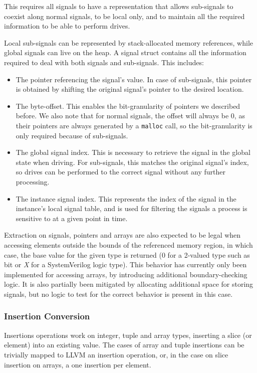 This requires all signals to have a representation that allows sub-signals to coexist along normal signals, to be local only, and to maintain all the required information to be able to perform drives.

Local sub-signals can be represented by stack-allocated memory references, while global signals can live on the heap. A signal struct contains all the information required to deal with both signals and sub-signals. This includes:

\begin{itemize}
    \item The pointer referencing the signal's value. In case of sub-signals, this pointer is obtained by shifting the original signal's pointer to the desired location.
    \item The byte-offset. This enables the bit-granularity of pointers we described before. We also note that for normal signals, the offset will always be $0$, as their pointers are always generated by a \texttt{malloc} call, so the bit-granularity is only required because of sub-signals.
    \item The global signal index. This is necessary to retrieve the signal in the global state when driving. For sub-signals, this matches the original signal's index, so drives can be performed to the correct signal without any further processing.
    \item The instance signal index. This represents the index of the signal in the instance's local signal table, and is used for filtering the signals a process is sensitive to at a given point in time.
\end{itemize}

Extraction on signals, pointers and arrays are also expected to be legal when accessing elements outside the bounds of the referenced memory region, in which case, the base value for the given type is returned (\ie $0$ for a 2-valued type such as bit or \textit{X} for a SystemVerilog logic type). This behavior has currently only been implemented for accessing arrays, by introducing additional boundary-checking logic. It is also partially been mitigated by allocating additional space for storing signals, but no logic to test for the correct behavior is present in this case.


\subsubsection{Insertion Conversion}
Insertions operations work on integer, tuple and array types, inserting a slice (or element) into an existing value. The cases of array and tuple insertions can be trivially mapped to LLVM an insertion operation, or, in the case on slice insertion on arrays, a one insertion per element.

